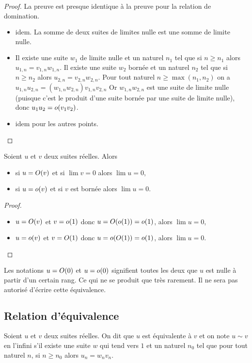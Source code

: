 \begin{proof}
  La preuve est presque identique à la preuve pour la relation de domination.
  \begin{itemize}
  \item idem. La somme de deux suites de limites nulle est une somme de limite nulle.
  \item Il existe une suite $w_1$ de limite nulle et un naturel $n_1$ tel que si $n \geq n_1$ alors $u_{1,n}=v_{1,n} w_{1,n}$. Il existe une suite $w_2$ bornée et un naturel $n_2$ tel que si $n \geq n_2$ alors $u_{2,n}=v_{2,n} w_{2,n}$. Pour tout naturel $n \geq \max(n_1,n_2)$ on a $u_{1,n}u_{2,n} = (w_{1,n}w_{2,n}) v_{1,n}v_{2,n}$ Or $w_{1,n}w_{2,n}$ est une suite de limite nulle (puisque c'est le produit d'une suite bornée par une suite de limite nulle), donc $u_1u_2=o\mathopen{}\left(v_1 v_2\right)$.
  \item idem pour les autres points.
  \end{itemize}
\end{proof}
\begin{prop}
  Soient $u$ et $v$ deux suites réelles. Alors
  \begin{itemize}
  \item si $u=O\mathopen{}\left(v\right)$ et si $\lim v=0$ alors $\lim u=0$,
  \item si $u=o\mathopen{}\left(v\right)$ et si $v$ est bornée alors $\lim u=0$.
  \end{itemize}
\end{prop}
\begin{proof}
  \begin{itemize}
  \item $u=O\mathopen{}\left(v\right)$ et $v=o\mathopen{}\left(1\right)$ donc $u=O\mathopen{}\left(o\mathopen{}\left(1\right)\right)=o\mathopen{}\left(1\right)$, alors $\lim u =0$,
  \item $u=o\mathopen{}\left(v\right)$ et $v=O\mathopen{}\left(1\right)$ donc $u=o\mathopen{}\left(O\mathopen{}\left(1\right)\right)=o\mathopen{}\left(1\right)$, alors $\lim u =0$.
  \end{itemize}
\end{proof}

\danger Les notations $u=O\mathopen{}\left(0\right)$ et $u=o\mathopen{}\left(0\right)$ signifient toutes les deux que $u$ est nulle à partir d'un certain rang. Ce qui ne se produit que très rarement. Il ne sera pas autorisé d'écrire cette équivalence.

\subsection{Relation d'équivalence}

\begin{defdef}
  Soient $u$ et $v$ deux suites réelles. On dit que $u$ est équivalente à $v$ et on note $u \sim v$ en l'infini s'il existe une suite $w$ qui tend vers $1$ et un naturel $n_0$ tel que pour tout naturel $n$, si $n \geq n_0$ alors $u_n =w_n v_n$.
\end{defdef}

